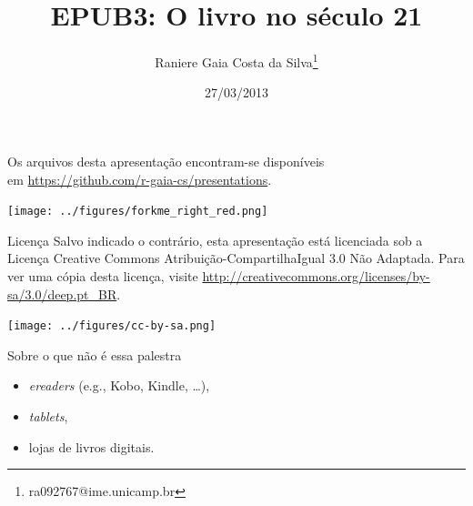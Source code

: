 \documentclass[11pt]{beamer}
\newcommand{\flang}[1]{\textit{#1}}
\begin{document}
\title[EPUB3]{EPUB3: O livro no século 21}
\author[Raniere Silva]{Raniere Gaia Costa da
Silva\footnote{ra092767@ime.unicamp.br}}
\date{27/03/2013}

\begin{frame}
  \maketitle
\end{frame}

\begin{frame}
  \begin{block}{}
    Os arquivos desta apresentação encontram-se disponíveis \\
    em \url{https://github.com/r-gaia-cs/presentations}. \\
    \vspace{-33pt}
    \begin{flushright}
      \texttt{[image: ../figures/forkme\_right\_red.png]}
    \end{flushright}
  \end{block}

  \begin{block}{Licença}
    Salvo indicado o contrário, esta apresentação está licenciada sob a
    Licença Creative Commons Atribuição-CompartilhaIgual 3.0 Não Adaptada.
    Para ver uma cópia desta licença, visite
    \url{http://creativecommons.org/licenses/by-sa/3.0/deep.pt_BR}.
    \begin{center}
      \texttt{[image: ../figures/cc-by-sa.png]}
    \end{center}
  \end{block}
\end{frame}


\begin{frame}{Sobre o que não é essa palestra}
  \begin{itemize}
    \item \flang{ereaders} (e.g., Kobo, Kindle, \ldots),
    \item \flang{tablets},
    \item lojas de livros digitais.
  \end{itemize}
\end{frame}
\end{document}
